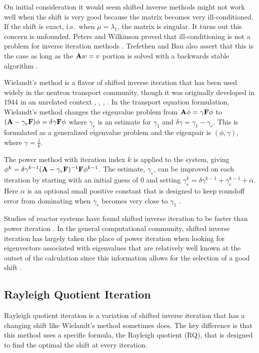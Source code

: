On initial consideration it would seem shifted inverse methods might not work well when the shift is very good because the matrix becomes very ill-conditioned. If the shift is exact, i.e.\ when $\mu = \lambda_{1}$, the matrix is singular. It turns out this concern is unfounded. Peters and Wilkinson proved that ill-conditioning is not a problem for inverse iteration methods \cite{Peters1979}. Trefethen and Bau also assert that this is the case as long as the $\mathbf{A}w = v$ portion is solved with a backwards stable algorithm \cite{Trefethen1997}.

Wielandt's method is a flavor of shifted inverse iteration that has been used widely in the neutron transport community, though it was originally developed in 1944 in an unrelated context \cite{Zinzani2008}, \cite{Itagaki1996}, \cite{Itagaki2002}, \cite{Ipsen}. In the transport equation formulation, Wielandt's method changes the eigenvalue problem from $\mathbf{A}\phi = \gamma \mathbf{F} \phi$ to $(\mathbf{A} - \gamma_e \mathbf{F})\phi = \delta \gamma \mathbf{F} \phi$ where $\gamma_e$ is an estimate for $\gamma_1$ and $\delta \gamma = \gamma_1 - \gamma_e$. This is formulated as a generalized eigenvalue problem and the eigenpair is $(\phi, \gamma)$, where $\gamma = \frac{1}{k}$.

The power method with iteration index $k$ is applied to the system, giving $\phi^k = \delta \gamma^{k-1}(\mathbf{A} - \gamma_e \mathbf{F})^{-1}\mathbf{F}\phi^{k-1}$. The estimate, $\gamma_e$, can be improved on each iteration by starting with an initial guess of $0$ and setting $\gamma_e^k = \delta \gamma^{k-1} + \gamma_e^{k-1} + \alpha$. Here $\alpha$ is an optional small positive constant that is designed to keep roundoff error from dominating when $\gamma_e$ becomes very close to $\gamma_1$ \cite{Nakamura1977}. 

Studies of reactor systems have found shifted inverse iteration to be faster than power iteration \cite{Allen2002}. In the general computational community, shifted inverse iteration has largely taken the place of power iteration when looking for eigenvectors associated with eigenvalues that are relatively well known at the outset of the calculation since this information allows for the selection of a good shift \cite{Ipsen}.  

\subsection{Rayleigh Quotient Iteration}
Rayleigh quotient iteration is a variation of shifted inverse iteration that has a changing shift like Wielandt's method sometimes does. The key difference is that this method uses a specific formula, the Rayleigh quotient (RQ), that is designed to find the optimal the shift at every iteration. 

